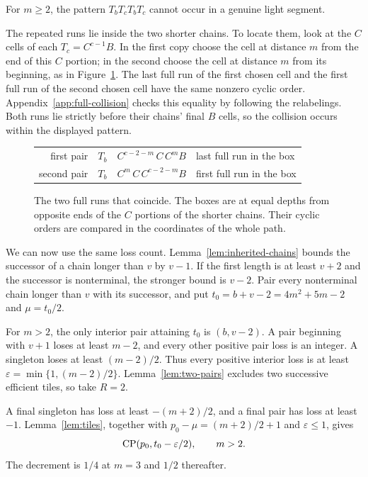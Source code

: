 \begin{lemma}\label{lem:two-pairs}
For $m\ge2$, the pattern $T_bT_cT_bT_c$ cannot occur in a genuine
light segment.
\end{lemma}

The repeated runs lie inside the two shorter chains. To locate them,
look at the $C$ cells of each $T_c=C^{c-1}B$. In the first copy choose
the cell at distance $m$ from the end of this $C$ portion; in the second
choose the cell at distance $m$ from its beginning, as in
Figure~\ref{fig:collision}. The last full run of the first chosen cell
and the first full run of the second chosen cell have the same nonzero
cyclic order. Appendix~\ref{app:full-collision} checks this equality by
following the relabelings. Both runs lie strictly before their chains'
final $B$ cells, so the collision occurs within the displayed pattern.

\begin{figure}[htbp]
\centering
\renewcommand{\arraystretch}{1.6}
\begin{tabular}{r l l}
first pair & $T_b\quad C^{c-2-m}\,\boxed{C}\,C^mB$
 & last full run in the box\\
second pair & $T_b\quad C^m\,\boxed{C}\,C^{c-2-m}B$
 & first full run in the box
\end{tabular}
\caption{The two full runs that coincide. The boxes are at equal depths
from opposite ends of the $C$ portions of the shorter chains. Their
cyclic orders are compared in the coordinates of the whole path.}
\label{fig:collision}
\end{figure}

We can now use the same loss count. Lemma~\ref{lem:inherited-chains} bounds the successor of a chain
longer than $v$ by $v-1$. If the first length is at least $v+2$ and
the successor is nonterminal, the stronger bound is $v-2$.
Pair every nonterminal chain longer than $v$ with its successor, and
put $t_0=b+v-2=4m^2+5m-2$ and $\mu=t_0/2$.

For $m>2$, the only interior pair attaining $t_0$ is $(b,v-2)$.
A pair beginning with $v+1$ loses at least $m-2$, and every other
positive pair loss is an integer. A singleton loses at least
$(m-2)/2$. Thus every positive interior loss is at least
$\varepsilon=\min\{1,(m-2)/2\}$. Lemma~\ref{lem:two-pairs}
excludes two successive efficient tiles, so take $R=2$.

A final singleton has loss at least $-(m+2)/2$, and a final pair has
loss at least $-1$. Lemma~\ref{lem:tiles}, together with
$p_0-\mu=(m+2)/2+1$ and $\varepsilon\le1$, gives
\begin{equation}\label{eq:CP2}
 \operatorname{CP}(p_0,t_0-\varepsilon/2),\qquad m>2.
\end{equation}
The decrement is $1/4$ at $m=3$ and $1/2$ thereafter.

